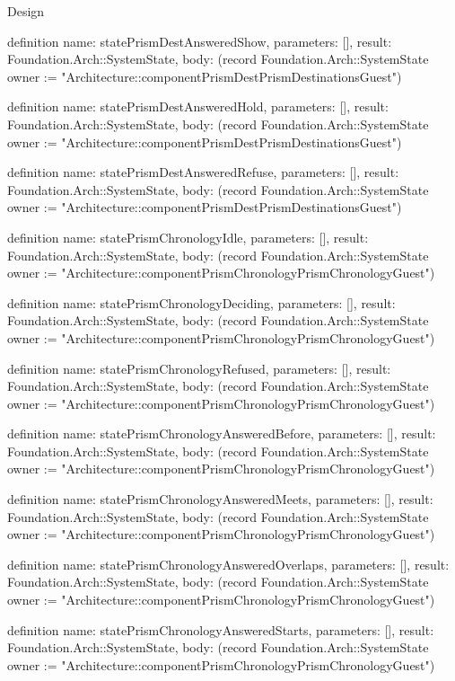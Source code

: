 \begin{lexlean}{Design}
\begin{semanticmodule}
definition{
  name: statePrismDestAnsweredShow,
  parameters: [],
  result: Foundation.Arch::SystemState,
  body: (record Foundation.Arch::SystemState {owner := "Architecture::componentPrismDestPrismDestinationsGuest"})
}

definition{
  name: statePrismDestAnsweredHold,
  parameters: [],
  result: Foundation.Arch::SystemState,
  body: (record Foundation.Arch::SystemState {owner := "Architecture::componentPrismDestPrismDestinationsGuest"})
}

definition{
  name: statePrismDestAnsweredRefuse,
  parameters: [],
  result: Foundation.Arch::SystemState,
  body: (record Foundation.Arch::SystemState {owner := "Architecture::componentPrismDestPrismDestinationsGuest"})
}

definition{
  name: statePrismChronologyIdle,
  parameters: [],
  result: Foundation.Arch::SystemState,
  body: (record Foundation.Arch::SystemState {owner := "Architecture::componentPrismChronologyPrismChronologyGuest"})
}

definition{
  name: statePrismChronologyDeciding,
  parameters: [],
  result: Foundation.Arch::SystemState,
  body: (record Foundation.Arch::SystemState {owner := "Architecture::componentPrismChronologyPrismChronologyGuest"})
}

definition{
  name: statePrismChronologyRefused,
  parameters: [],
  result: Foundation.Arch::SystemState,
  body: (record Foundation.Arch::SystemState {owner := "Architecture::componentPrismChronologyPrismChronologyGuest"})
}

definition{
  name: statePrismChronologyAnsweredBefore,
  parameters: [],
  result: Foundation.Arch::SystemState,
  body: (record Foundation.Arch::SystemState {owner := "Architecture::componentPrismChronologyPrismChronologyGuest"})
}

definition{
  name: statePrismChronologyAnsweredMeets,
  parameters: [],
  result: Foundation.Arch::SystemState,
  body: (record Foundation.Arch::SystemState {owner := "Architecture::componentPrismChronologyPrismChronologyGuest"})
}

definition{
  name: statePrismChronologyAnsweredOverlaps,
  parameters: [],
  result: Foundation.Arch::SystemState,
  body: (record Foundation.Arch::SystemState {owner := "Architecture::componentPrismChronologyPrismChronologyGuest"})
}

definition{
  name: statePrismChronologyAnsweredStarts,
  parameters: [],
  result: Foundation.Arch::SystemState,
  body: (record Foundation.Arch::SystemState {owner := "Architecture::componentPrismChronologyPrismChronologyGuest"})
}


\end{semanticmodule}
\end{lexlean}

